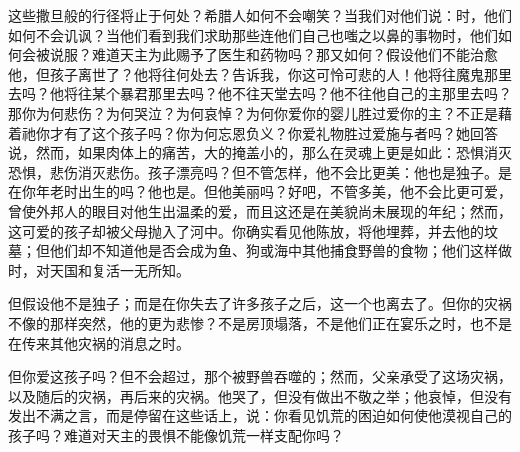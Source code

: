 这些撒旦般的行径将止于何处？希腊人如何不会嘲笑？当我们对他们说：时，他们如何不会讥讽？当他们看到我们求助那些连他们自己也嗤之以鼻的事物时，他们如何会被说服？难道天主为此赐予了医生和药物吗？那又如何？假设他们不能治愈他，但孩子离世了？他将往何处去？告诉我，你这可怜可悲的人！他将往魔鬼那里去吗？他将往某个暴君那里去吗？他不往天堂去吗？他不往他自己的主那里去吗？那你为何悲伤？为何哭泣？为何哀悼？为何你爱你的婴儿胜过爱你的主？不正是藉着祂你才有了这个孩子吗？你为何忘恩负义？你爱礼物胜过爱施与者吗？她回答说，然而，如果肉体上的痛苦，大的掩盖小的，那么在灵魂上更是如此：恐惧消灭恐惧，悲伤消灭悲伤。孩子漂亮吗？但不管怎样，他不会比更美：他也是独子。是在你年老时出生的吗？他也是。但他美丽吗？好吧，不管多美，他不会比更可爱，曾使外邦人的眼目对他生出温柔的爱，而且这还是在美貌尚未展现的年纪；然而，这可爱的孩子却被父母抛入了河中。你确实看见他陈放，将他埋葬，并去他的坟墓；但他们却不知道他是否会成为鱼、狗或海中其他捕食野兽的食物；他们这样做时，对天国和复活一无所知。\par

但假设他不是独子；而是在你失去了许多孩子之后，这一个也离去了。但你的灾祸不像的那样突然，他的更为悲惨？不是房顶塌落，不是他们正在宴乐之时，也不是在传来其他灾祸的消息之时。\par

但你爱这孩子吗？但不会超过，那个被野兽吞噬的；然而，父亲承受了这场灾祸，以及随后的灾祸，再后来的灾祸。他哭了，但没有做出不敬之举；他哀悼，但没有发出不满之言，而是停留在这些话上，说：你看见饥荒的困迫如何使他漠视自己的孩子吗？难道对天主的畏惧不能像饥荒一样支配你吗？\par

